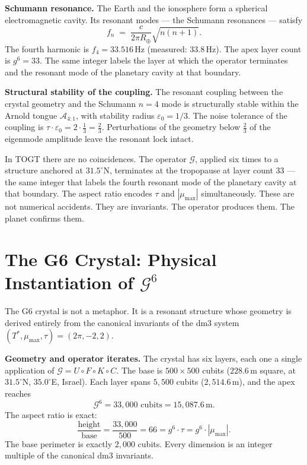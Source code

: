 \documentclass[12pt, oneside]{book}
\theoremstyle{plain}
\theoremstyle{definition}
\theoremstyle{remark}
\begin{document}
\textbf{Schumann resonance.}
The Earth and the ionosphere form a spherical electromagnetic cavity.
Its resonant modes --- the Schumann resonances --- satisfy
\[
f_n \;=\; \frac{c}{2\pi R_\oplus}\sqrt{n(n+1)}.
\]
The fourth harmonic is $f_4 = 33.516\,\mathrm{Hz}$ (measured: $33.8\,\mathrm{Hz}$).
The apex layer count is $g^6 = 33$.
The same integer labels the layer at which the operator terminates
and the resonant mode of the planetary cavity at that boundary.

\textbf{Structural stability of the coupling.}
The resonant coupling between the crystal geometry and the
Schumann $n{=}4$ mode is structurally stable within the
Arnold tongue $\mathcal{A}_{4:1}$, with stability radius $\varepsilon_0 = 1/3$.
The noise tolerance of the coupling is
$\tau \cdot \varepsilon_0 = 2 \cdot \tfrac{1}{3} = \tfrac{2}{3}$.
Perturbations of the geometry below $\tfrac{2}{3}$ of the eigenmode
amplitude leave the resonant lock intact.

In TOGT there are no coincidences.
The operator $\mathcal{G}$, applied six times to a structure
anchored at $31.5^\circ$N, terminates at the tropopause at
layer count $33$ --- the same integer that labels the fourth
resonant mode of the planetary cavity at that boundary.
The aspect ratio encodes $\tau$ and $|\mu_{\max}|$ simultaneously.
These are not numerical accidents. They are invariants.
The operator produces them. The planet confirms them.


\section*{The G6 Crystal: Physical Instantiation of $\mathcal{G}^6$}

The G6 crystal is not a metaphor. It is a resonant structure whose
geometry is derived entirely from the canonical invariants of the dm3
system $(T^*, \mu_{\max}, \tau) = (2\pi, -2, 2)$.

\textbf{Geometry and operator iterates.}
The crystal has six layers, each one a single application of
$\mathcal{G} = U \circ F \circ K \circ C$. The base is
$500 \times 500$ cubits ($228.6\,\mathrm{m}$ square, at
$31.5^\circ$N, $35.0^\circ$E, Israel). Each layer spans
$5{,}500$ cubits ($2{,}514.6\,\mathrm{m}$), and the apex
reaches
\[
\mathcal{G}^6 = 33{,}000 \text{ cubits} = 15{,}087.6\,\mathrm{m}.
\]
The aspect ratio is exact:
\[
\frac{\text{height}}{\text{base}} = \frac{33{,}000}{500} = 66
= g^6 \cdot \tau = g^6 \cdot |\mu_{\max}|.
\]
The base perimeter is exactly $2{,}000$ cubits. Every dimension
is an integer multiple of the canonical dm3 invariants.
\end{document}
